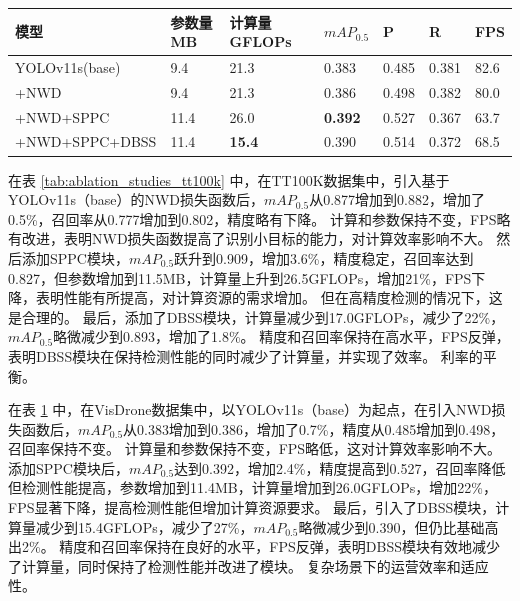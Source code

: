 \begin{table}[htbp]
    \centering
    \captionsetup{font=footnotesize}
    \label{tab:ablation_studies_vd}
    \begin{tabular}{p{}p{}p{}p{}p{}p{}p{}}
        \toprule
        模型       & 参数量 MB & 计算量 GFLOPs & $mAP_{0.5}$   & P     & R     & FPS \\ 
        \midrule
        YOLOv11s(base) & 9.4           & 21.3          & 0.383          & 0.485  & 0.381 & 82.6 \\
        +NWD           & 9.4           & 21.3          & 0.386          & 0.498  & 0.382 & 80.0 \\
        +NWD+SPPC      & 11.4          & 26.0          & \textbf{0.392} & 0.527  & 0.367 & 63.7 \\
        +NWD+SPPC+DBSS & 11.4          & \textbf{15.4} & 0.390 & 0.514  & 0.372 & 68.5 \\
        \bottomrule
    \end{tabular}
\end{table}

在表 \ref{tab:ablation_studies_tt100k} 中，在TT100K数据集中，引入基于YOLOv11s（base）的NWD损失函数后，$mAP_{0.5}$从0.877增加到0.882，增加了0.5\%，召回率从0.777增加到0.802，精度略有下降。 计算和参数保持不变，FPS略有改进，表明NWD损失函数提高了识别小目标的能力，对计算效率影响不大。 然后添加SPPC模块，$mAP_{0.5}$跃升到0.909，增加3.6\%，精度稳定，召回率达到0.827，但参数增加到11.5MB，计算量上升到26.5GFLOPs，增加21\%，FPS下降，表明性能有所提高，对计算资源的需求增加。 但在高精度检测的情况下，这是合理的。 最后，添加了DBSS模块，计算量减少到17.0GFLOPs，减少了22\%，$mAP_{0.5}$略微减少到0.893，增加了1.8\%。 精度和召回率保持在高水平，FPS反弹，表明DBSS模块在保持检测性能的同时减少了计算量，并实现了效率。 利率的平衡。

在表 \ref{tab:ablation_studies_vd} 中，在VisDrone数据集中，以YOLOv11s（base）为起点，在引入NWD损失函数后，$mAP_{0.5}$从0.383增加到0.386，增加了0.7\%，精度从0.485增加到0.498，召回率保持不变。 计算量和参数保持不变，FPS略低，这对计算效率影响不大。 添加SPPC模块后，$mAP_{0.5}$达到0.392，增加2.4\%，精度提高到0.527，召回率降低但检测性能提高，参数增加到11.4MB，计算量增加到26.0GFLOPs，增加22\%，FPS显著下降，提高检测性能但增加计算资源要求。 最后，引入了DBSS模块，计算量减少到15.4GFLOPs，减少了27\%，$mAP_{0.5}$略微减少到0.390，但仍比基础高出2\%。 精度和召回率保持在良好的水平，FPS反弹，表明DBSS模块有效地减少了计算量，同时保持了检测性能并改进了模块。 复杂场景下的运营效率和适应性。

